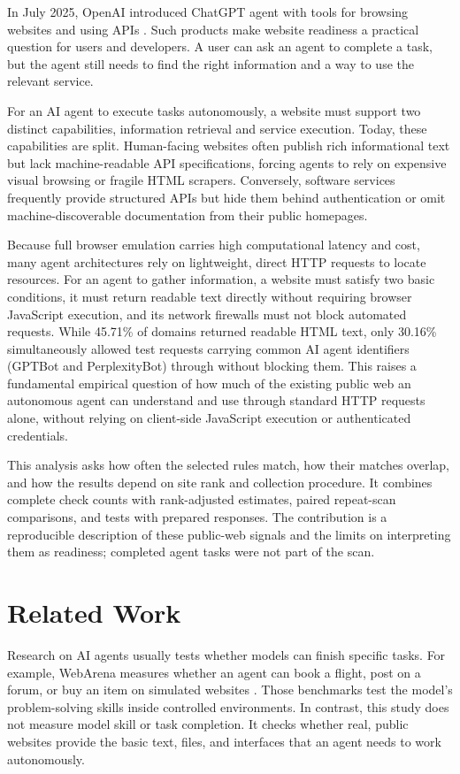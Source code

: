 \documentclass{article}
\begin{document}
In July 2025, OpenAI introduced ChatGPT agent with tools for browsing websites and using APIs \cite{ref32}. Such products make website readiness a practical question for users and developers. A user can ask an agent to complete a task, but the agent still needs to find the right information and a way to use the relevant service.

For an AI agent to execute tasks autonomously, a website must support two distinct capabilities, information retrieval and service execution. Today, these capabilities are split. Human-facing websites often publish rich informational text but lack machine-readable API specifications, forcing agents to rely on expensive visual browsing or fragile HTML scrapers. Conversely, software services frequently provide structured APIs but hide them behind authentication or omit machine-discoverable documentation from their public homepages.

Because full browser emulation carries high computational latency and cost, many agent architectures rely on lightweight, direct HTTP requests to locate resources. For an agent to gather information, a website must satisfy two basic conditions, it must return readable text directly without requiring browser JavaScript execution, and its network firewalls must not block automated requests. While 45.71\% of domains returned readable HTML text, only 30.16\% simultaneously allowed test requests carrying common AI agent identifiers (GPTBot and PerplexityBot) through without blocking them. This raises a fundamental empirical question of how much of the existing public web an autonomous agent can understand and use through standard HTTP requests alone, without relying on client-side JavaScript execution or authenticated credentials.

This analysis asks how often the selected rules match, how their matches overlap, and how the results depend on site rank and collection procedure. It combines complete check counts with rank-adjusted estimates, paired repeat-scan comparisons, and tests with prepared responses. The contribution is a reproducible description of these public-web signals and the limits on interpreting them as readiness; completed agent tasks were not part of the scan.

\section{Related Work}

Research on AI agents usually tests whether models can finish specific tasks. For example, WebArena measures whether an agent can book a flight, post on a forum, or buy an item on simulated websites \cite{ref33}. Those benchmarks test the model's problem-solving skills inside controlled environments. In contrast, this study does not measure model skill or task completion. It checks whether real, public websites provide the basic text, files, and interfaces that an agent needs to work autonomously.
\end{document}
